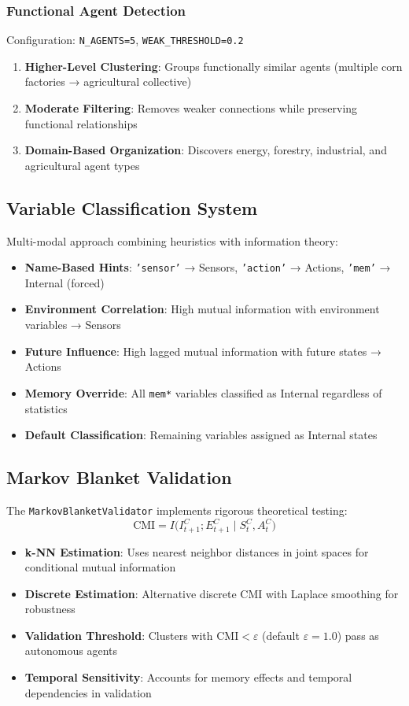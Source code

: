 \documentclass[10pt,conference]{IEEEtran}
\begin{document}
\subsubsection{Functional Agent Detection}  
Configuration: \texttt{N\_AGENTS=5}, \texttt{WEAK\_THRESHOLD=0.2}
\begin{enumerate}
  \item \textbf{Higher-Level Clustering}: Groups functionally similar agents (multiple corn factories → agricultural collective)
  \item \textbf{Moderate Filtering}: Removes weaker connections while preserving functional relationships
  \item \textbf{Domain-Based Organization}: Discovers energy, forestry, industrial, and agricultural agent types
\end{enumerate}

\subsection{Variable Classification System}
Multi-modal approach combining heuristics with information theory:
\begin{itemize}
  \item \textbf{Name-Based Hints}: \texttt{'sensor'} → Sensors, \texttt{'action'} → Actions, \texttt{'mem'} → Internal (forced)
  \item \textbf{Environment Correlation}: High mutual information with environment variables → Sensors
  \item \textbf{Future Influence}: High lagged mutual information with future states → Actions  
  \item \textbf{Memory Override}: All \texttt{mem*} variables classified as Internal regardless of statistics
  \item \textbf{Default Classification}: Remaining variables assigned as Internal states
\end{itemize}

\subsection{Markov Blanket Validation}
The \texttt{MarkovBlanketValidator} implements rigorous theoretical testing:
\[
\mathrm{CMI} = I\bigl(I^C_{t+1};E^C_{t+1}\mid S^C_t,A^C_t\bigr)
\]
\begin{itemize}
  \item \textbf{k-NN Estimation}: Uses nearest neighbor distances in joint spaces for conditional mutual information
  \item \textbf{Discrete Estimation}: Alternative discrete CMI with Laplace smoothing for robustness
  \item \textbf{Validation Threshold}: Clusters with $\mathrm{CMI} < \varepsilon$ (default $\varepsilon=1.0$) pass as autonomous agents
  \item \textbf{Temporal Sensitivity}: Accounts for memory effects and temporal dependencies in validation
\end{itemize}
\end{document}
